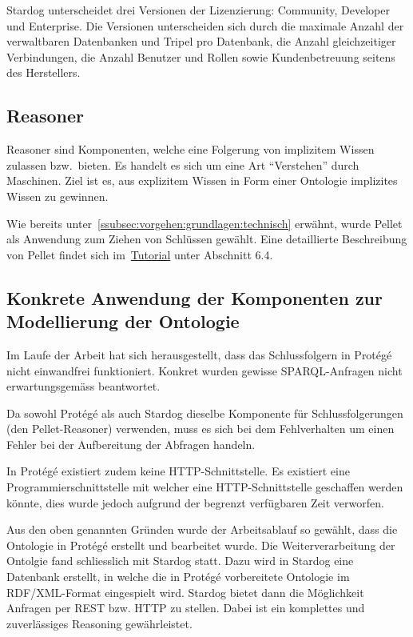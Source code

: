 Stardog unterscheidet drei Versionen der Lizenzierung: Community, Developer und Enterprise. Die Versionen unterscheiden sich durch die maximale Anzahl der verwaltbaren Datenbanken und Tripel pro Datenbank, die Anzahl gleichzeitiger Verbindungen, die Anzahl Benutzer und Rollen sowie Kundenbetreuung seitens des Herstellers.~\cite{stardog}

\subsection{Reasoner}
\label{subsec:komponenten_reasoner}
Reasoner sind Komponenten, welche eine Folgerung von implizitem Wissen zulassen bzw.\ bieten. Es handelt es sich um eine Art ``Verstehen'' durch Maschinen. Ziel ist es, aus explizitem Wissen in Form einer Ontologie implizites Wissen zu gewinnen.

Wie bereits unter~\autoref{ssubsec:vorgehen:grundlagen:technisch} erwähnt, wurde Pellet als Anwendung zum Ziehen von Schlüssen gewählt. Eine detaillierte Beschreibung von Pellet findet sich im~\hyperref[sec:anhang:tutorial_dokument]{Tutorial} unter Abschnitt 6.4.

\subsection{Konkrete Anwendung der Komponenten zur Modellierung der Ontologie}
\label{subsec:komponenten_anwendung}
Im Laufe der Arbeit hat sich herausgestellt, dass das Schlussfolgern in Protégé nicht einwandfrei funktioniert. Konkret wurden gewisse SPARQL-Anfragen nicht erwartungsgemäss beantwortet.

Da sowohl Protégé als auch Stardog dieselbe Komponente für Schlussfolgerungen (den Pellet-Reasoner) verwenden, muss es sich bei dem Fehlverhalten um einen Fehler bei der Aufbereitung der Abfragen handeln.

In Protégé existiert zudem keine HTTP-Schnittstelle. Es existiert eine Programmierschnittstelle mit welcher eine HTTP-Schnittstelle geschaffen werden könnte, dies wurde jedoch aufgrund der begrenzt verfügbaren Zeit verworfen.

Aus den oben genannten Gründen wurde der Arbeitsablauf so gewählt, dass die Ontologie in Protégé erstellt und bearbeitet wurde. Die Weiterverarbeitung der Ontolgie fand schliesslich mit Stardog statt. Dazu wird in Stardog eine Datenbank erstellt, in welche die in Protégé vorbereitete Ontologie im RDF/XML-Format eingespielt wird. Stardog bietet dann die Möglichkeit Anfragen per REST bzw. HTTP zu stellen. Dabei ist ein komplettes und zuverlässiges Reasoning gewährleistet.

